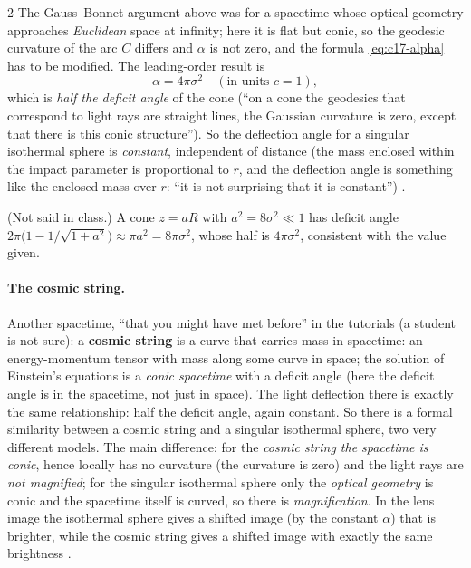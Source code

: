 \begin{paracol}{2}
The Gauss--Bonnet argument above was for a spacetime whose optical geometry approaches \emph{Euclidean} space at infinity; here it is flat but conic, so the geodesic curvature of the arc $C$ differs and $\alpha$ is not zero, and the formula \eqref{eq:c17-alpha} has to be modified. The leading-order result is
\[
  \alpha=4\pi\sigma^2\quad(\text{in units }c=1),
\]
which is \emph{half the deficit angle} of the cone (``on a cone the geodesics that correspond to light rays are straight lines, the Gaussian curvature is zero, except that there is this conic structure''). So the deflection angle for a singular isothermal sphere is \emph{constant}, independent of distance (the mass enclosed within the impact parameter is proportional to $r$, and the deflection angle is something like the enclosed mass over $r$: ``it is not surprising that it is constant'') .
\begin{coursenote}
(Not said in class.) A cone $z=aR$ with $a^2=8\sigma^2\ll1$ has deficit angle $2\pi\bigl(1-1/\sqrt{1+a^2}\bigr)\approx\pi a^2=8\pi\sigma^2$, whose half is $4\pi\sigma^2$, consistent with the value given.
\end{coursenote}

\paragraph{The cosmic string.} Another spacetime, ``that you might have met before'' in the tutorials (a student is not sure): a \textbf{cosmic string} is a curve that carries mass in spacetime: an energy-momentum tensor with mass along some curve in space; the solution of Einstein's equations is a \emph{conic spacetime} with a deficit angle (here the deficit angle is in the spacetime, not just in space). The light deflection there is exactly the same relationship: half the deficit angle, again constant. So there is a formal similarity between a cosmic string and a singular isothermal sphere, two very different models. The main difference: for the \emph{cosmic string the spacetime is conic}, hence locally has no curvature (the curvature is zero) and the light rays are \emph{not magnified}; for the singular isothermal sphere only the \emph{optical geometry} is conic and the spacetime itself is curved, so there is \emph{magnification}. In the lens image the isothermal sphere gives a shifted image (by the constant $\alpha$) that is brighter, while the cosmic string gives a shifted image with exactly the same brightness .


\end{paracol}
